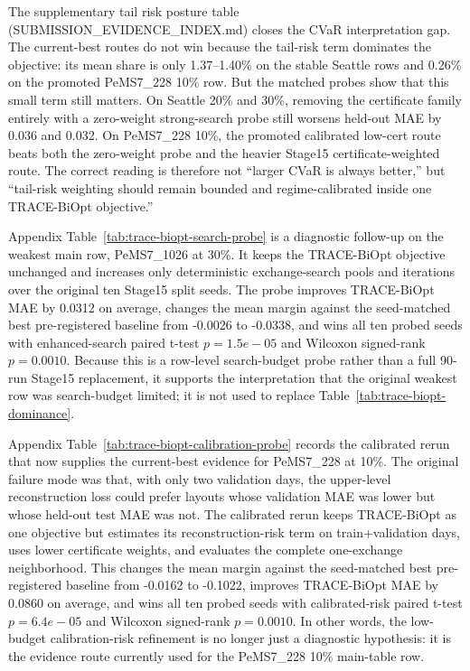 The supplementary tail risk posture table (SUBMISSION\_EVIDENCE\_INDEX.md)
closes the CVaR interpretation gap. The current-best routes do
not win because the tail-risk term dominates the objective: its mean share is
only 1.37--1.40\% on the stable Seattle rows and 0.26\% on the promoted
PeMS7\_228 10\% row. But the matched probes show that this small term still
matters. On Seattle 20\% and 30\%, removing the certificate family entirely
with a zero-weight strong-search probe still worsens held-out MAE by 0.036 and
0.032. On PeMS7\_228 10\%, the promoted calibrated low-cert route beats both
the zero-weight probe and the heavier Stage15 certificate-weighted route. The
correct reading is therefore not ``larger CVaR is always better,'' but
``tail-risk weighting should remain bounded and regime-calibrated inside one
TRACE-BiOpt objective.''

Appendix Table~\ref{tab:trace-biopt-search-probe} is a diagnostic follow-up on the
weakest main row, PeMS7\_1026 at 30\%. It keeps the TRACE-BiOpt objective
unchanged and increases only deterministic exchange-search pools and iterations
over the original ten Stage15 split seeds. The probe improves TRACE-BiOpt MAE
by 0.0312 on average,
changes the mean margin against the seed-matched best pre-registered baseline
from -0.0026 to -0.0338, and wins all ten probed seeds with enhanced-search
paired t-test $p=1.5e{-}05$ and Wilcoxon signed-rank $p=0.0010$. Because this
is a row-level search-budget probe rather than a full 90-run Stage15
replacement, it supports the interpretation that the original weakest row was
search-budget limited; it is not used to replace
Table~\ref{tab:trace-biopt-dominance}.

Appendix Table~\ref{tab:trace-biopt-calibration-probe} records the calibrated rerun that
now supplies the current-best evidence for PeMS7\_228 at 10\%. The original
failure mode was that, with only two validation days, the upper-level
reconstruction loss could prefer layouts whose validation MAE was lower but
whose held-out test MAE was not. The calibrated rerun keeps TRACE-BiOpt as one
objective but estimates its reconstruction-risk term on train+validation days,
uses lower certificate weights, and evaluates the complete one-exchange
neighborhood. This changes the mean margin against the seed-matched best
pre-registered baseline from -0.0162 to -0.1022, improves TRACE-BiOpt MAE by
0.0860 on average, and wins all ten probed seeds with calibrated-risk paired
t-test $p=6.4e{-}05$ and Wilcoxon signed-rank $p=0.0010$. In other words, the
low-budget calibration-risk refinement is no longer just a diagnostic
hypothesis: it is the evidence route currently used for the PeMS7\_228 10\%
main-table row.

